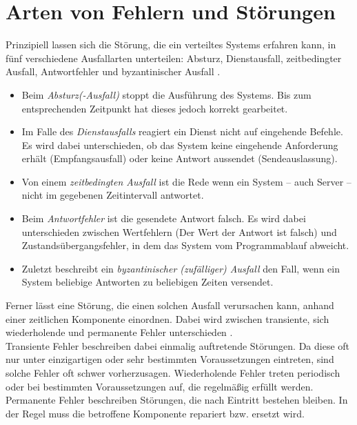 \documentclass[12pt,a4paper,parskip=half]{scrreprt}
\begin{document}
\section{Arten von Fehlern und Störungen}
Prinzipiell lassen sich die Störung, die ein verteiltes Systems erfahren kann, in fünf verschiedene Ausfallarten unterteilen: Absturz, Dienstausfall, zeitbedingter Ausfall, Antwortfehler und byzantinischer Ausfall \cite{vS-Dillinger}\cite{vS-TU-Braunschweig}.
\begin{itemize}
	\item Beim \textit{Absturz(-Ausfall)} stoppt die Ausführung des Systems. Bis zum entsprechenden Zeitpunkt hat dieses jedoch korrekt gearbeitet. %
	\item Im Falle des \textit{Dienstausfalls} reagiert ein Dienst nicht auf eingehende Befehle. Es wird dabei unterschieden, ob das System keine eingehende Anforderung erhält (Empfangsausfall) oder keine Antwort aussendet (Sendeauslassung).
	\item Von einem \textit{zeitbedingten Ausfall} ist die Rede wenn ein System -- auch Server -- nicht im gegebenen Zeitintervall antwortet.
	\item Beim \textit{Antwortfehler} ist die gesendete Antwort falsch. Es wird dabei unterschieden zwischen Wertfehlern (Der Wert der Antwort ist falsch) und Zustandsübergangsfehler, in dem das System vom Programmablauf abweicht.
	\item Zuletzt beschreibt ein \textit{byzantinischer (zufälliger) Ausfall} den Fall, wenn ein System beliebige Antworten zu beliebigen Zeiten versendet.
\end{itemize}
Ferner lässt eine Störung, die einen solchen Ausfall verursachen kann, anhand einer zeitlichen Komponente einordnen. Dabei wird zwischen transiente, sich wiederholende und permanente Fehler unterschieden \cite{vS-Dillinger}.\\
Transiente Fehler beschreiben dabei einmalig auftretende Störungen. Da diese oft nur unter einzigartigen oder sehr bestimmten Voraussetzungen eintreten, sind solche Fehler oft schwer vorherzusagen. Wiederholende Fehler treten periodisch oder bei bestimmten Voraussetzungen auf, die regelmäßig erfüllt werden. Permanente Fehler beschreiben Störungen, die nach Eintritt bestehen bleiben. In der Regel muss die betroffene Komponente repariert bzw. ersetzt wird.
\end{document}
